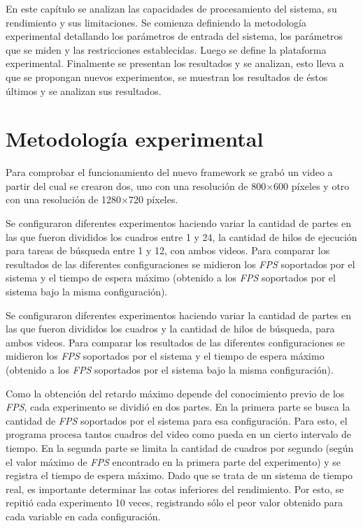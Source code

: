 
En este capítulo se analizan las capacidades de procesamiento del sistema, su
rendimiento y sus limitaciones. Se comienza definiendo la metodología
experimental detallando los parámetros de entrada del sistema, los parámetros
que se miden y las restricciones establecidas. Luego se define la plataforma
experimental. Finalmente se presentan los resultados y se analizan, esto lleva a
que se propongan nuevos experimentos, se muestran los resultados de éstos
últimos y se analizan sus resultados.

\section{Metodología experimental}

\label{metodologiaExperimental}

Para comprobar el funcionamiento del nuevo framework se grabó un video a partir
del cual se crearon dos, uno con una resolución de 800$\times$600 píxeles y otro
con una resolución de 1280$\times$720 píxeles.

Se configuraron diferentes experimentos haciendo variar la cantidad de partes en
las que fueron divididos los cuadros entre 1 y 24, la cantidad de hilos de
ejecución para tareas de búsqueda entre 1 y 12, con ambos videos. Para comparar
los resultados de las diferentes configuraciones se midieron los \emph{FPS}
soportados por el sistema y el tiempo de espera máximo (obtenido a los
\emph{FPS} soportados por el sistema bajo la misma configuración).

Se configuraron diferentes experimentos haciendo variar la cantidad de partes en
las que fueron divididos los cuadros y la cantidad de hilos de búsqueda, para
ambos videos. Para comparar los resultados de las diferentes configuraciones se
midieron los \emph{FPS} soportados por el sistema y el tiempo de espera máximo
(obtenido a los \emph{FPS} soportados por el sistema bajo la misma
configuración).

Como la obtención del retardo máximo depende del conocimiento previo de los
\emph{FPS}, cada experimento se dividió en dos partes. En la primera parte se
busca la cantidad de \emph{FPS} soportados por el sistema para esa
configuración. Para esto, el programa procesa tantos cuadros del video como
pueda en un cierto intervalo de tiempo. En la segunda parte se limita la
cantidad de cuadros por segundo (según el valor máximo de \emph{FPS} encontrado
en la primera parte del experimento) y se registra el tiempo de espera máximo.
Dado que se trata de un sistema de tiempo real, es importante determinar las
cotas inferiores del rendimiento. Por esto, se repitió cada experimento 10
veces, registrando sólo el peor valor obtenido para cada variable en cada
configuración.

